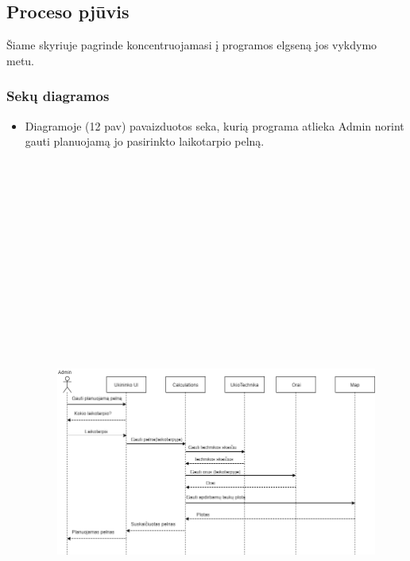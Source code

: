 \documentclass[oneside]{VUMIFPSkursinis}
\begin{document}
\subsection{Proceso pjūvis}
Šiame skyriuje pagrinde koncentruojamasi į programos elgseną jos vykdymo metu.
\subsubsection{Sekų diagramos}
\begin{itemize}
\item Diagramoje (12 pav) pavaizduotos seka, kurią programa atlieka Admin norint gauti planuojamą jo pasirinkto laikotarpio pelną.
		\begin{figure}[H]
		\centering	
	\includegraphics[width=17cm,height=20cm,keepaspectratio]{PelnoSkaičiavimas.png}

\end{figure}
\end{itemize}
\end{document}
